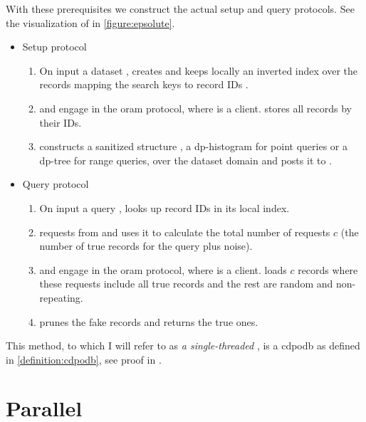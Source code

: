 		With these prerequisites we construct the actual setup and query protocols.
		See the visualization of \protocolQuery{} in \cref{figure:epsolute}.
		\begin{itemize}
			\item
				Setup protocol \protocolSetup{}
				\begin{enumerate}
					\item
						On input a dataset \database{}, \user{} creates and keeps locally an inverted index over the records mapping the search keys \searchKey{} to record IDs \recordID{}.
					\item
						\user{} and \server{} engage in the \acrshort{oram} protocol, where \user{} is a client.
						\user{} stores all records by their IDs.
					\item
						\user{} constructs a sanitized structure \serverDS{}, a \acrshort{dp}-histogram for point queries or a \acrshort{dp}-tree for range queries, over the dataset domain and posts it to \server{}.
				\end{enumerate}
			\item
				Query protocol \protocolQuery{}
				\begin{enumerate}
					\item
						On input a query \query{}, \user{} looks up record IDs in its local index.
					\item
						\user{} requests \serverDS{} from \server{} and uses it to calculate the total number of requests $c$ (the number of true records for the query plus noise).
					\item
						\user{} and \server{} engage in the \acrshort{oram} protocol, where \user{} is a client.
						\user{} loads $c$ records where these requests include all true records and the rest are random and non-repeating.
					\item
						\user{} prunes the fake records and returns the true ones.
				\end{enumerate}
		\end{itemize}

		

		This method, to which I will refer to as \emph{a single-threaded \epsolute{}}, is a \acrlong{cdpodb} as defined in \cref{definition:cdpodb}, see proof in \cite[Section 4.2]{epsolute}.

	\section{Parallel \epsolute{}}

